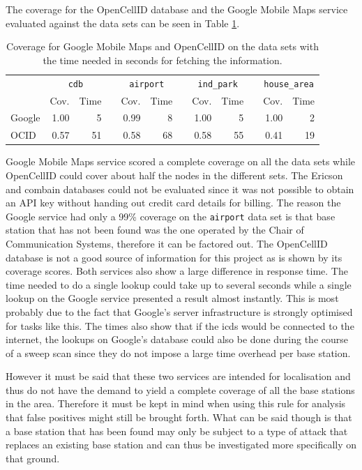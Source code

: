 The coverage for the OpenCellID database and the Google Mobile Maps service evaluated against the data sets can be seen in Table \ref{tab:coverage}.
\begin{table}
\centering
\begin{tabular}{lrrcrrcrrcrr}
\toprule
& \multicolumn{2}{c}{\texttt{cdb}} &\phantom{a}& \multicolumn{2}{c}{\texttt{airport}} &\phantom{a} & \multicolumn{2}{c}{\texttt{ind\_park}}&\phantom{a} & \multicolumn{2}{c}{\texttt{house\_area}}\\
\cmidrule{2-3} \cmidrule{5-6} \cmidrule{8-9} \cmidrule{11-12}
&Cov.&Time&	&Cov.&Time&	&Cov.&Time&	&Cov.&Time\\
\midrule
Google&		1.00&5&	&0.99&8&	&1.00&5&	&1.00&2\\
OCID&		0.57&51&	&0.58&68&	&0.58&55&	&0.41&19\\
\bottomrule
\end{tabular}
\caption{Coverage for Google Mobile Maps and OpenCellID on the data sets with the time needed in seconds for fetching the information.}
\label{tab:coverage}
\end{table}
Google Mobile Maps service scored a complete coverage on all the data sets while OpenCellID could cover about half the nodes in the different sets.
The Ericson and combain databases could not be evaluated since it was not possible to obtain an API key without handing out credit card details for billing.
The reason the Google service had only a 99\% coverage on the \texttt{airport} data set is that base station that has not been found was the one operated by the Chair of Communication Systems, therefore it can be factored out.
The OpenCellID database is not a good source of information for this project as is shown by its coverage scores.
Both services also show a large difference in response time.
The time needed to do a single lookup could take up to several seconds while a single lookup on the Google service presented a result almost instantly.
This is most probably due to the fact that Google's server infrastructure is strongly optimised for tasks like this.
The times also show that if the \gls{icds} would be connected to the internet, the lookups on Google's database could also be done during the course of a sweep scan since they do not impose a large time overhead per base station.

However it must be said that these two services are intended for localisation and thus do not have the demand to yield a complete coverage of all the base stations in the area.
Therefore it must be kept in mind when using this rule for analysis that false positives might still be brought forth.
What can be said though is that a base station that has been found may only be subject to a type of attack that replaces an existing base station and can thus be investigated more specifically on that ground.

